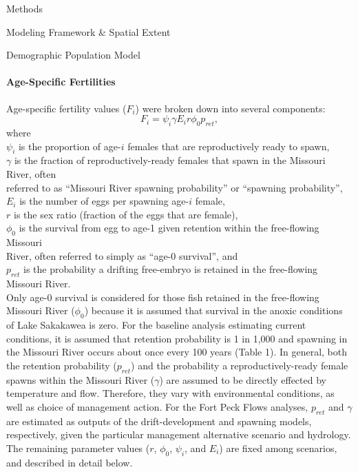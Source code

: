 \documentclass[12pt]{article}
\begin{document}
\begin{section}{Methods}
\begin{subsection}{Modeling Framework \& Spatial Extent}
\begin{subsubsection}{Demographic Population Model}
\paragraph{Age-Specific Fertilities}
Age-specific fertility values ($F_i$) were broken down into several components:
\begin{equation}
F_i=\psi_i\gamma E_ir\phi_{0}p_{ret},
\end{equation}
where\\
\hspace*{0.5cm}$\psi_i$ is the proportion of age-$i$ females that are reproductively ready to spawn,\\
\hspace*{0.5cm}$\gamma$ is the fraction of reproductively-ready females that spawn in the Missouri River, often\\
\hspace*{1.5cm}referred to as ``Missouri River spawning probability'' or ``spawning probability'',\\
\hspace*{0.5cm}$E_i$ is the number of eggs per spawning age-$i$ female,\\ 
\hspace*{0.5cm}$r$ is the sex ratio (fraction of the eggs that are female),\\
\hspace*{0.5cm}$\phi_{0}$ is the survival from egg to age-1 given retention within the free-flowing Missouri\\
\hspace*{1.5cm}River, often referred to simply as ``age-0 survival'', and\\
\hspace*{0.5cm}$p_{ret}$ is the probability a drifting free-embryo is retained in the free-flowing Missouri River.\\

Only age-0 survival is considered for those fish retained in the free-flowing Missouri River ($\phi_{0}$) because it is assumed that survival in the anoxic conditions of Lake Sakakawea is zero.   For the baseline analysis estimating current conditions, it is assumed that retention probability is 1 in 1,000 and spawning in the Missouri River occurs about once every 100 years (Table 1).   In general, both the retention probability ($p_{ret}$) and the probability a reproductively-ready female spawns within the Missouri River ($\gamma$) are assumed to be directly effected by temperature and flow.  Therefore, they vary with environmental conditions, as well as choice of management action.   For the Fort Peck Flows analyses, $p_{ret}$ and $\gamma$ are estimated as outputs of the drift-development and spawning models, respectively, given the particular management alternative scenario and hydrology.  The remaining parameter values ($r$, $\phi_0$, $\psi_i$, and $E_i$) are fixed among scenarios, and described in detail below.\\ 


\end{subsubsection}
\end{subsection}
\end{section}
\end{document}
